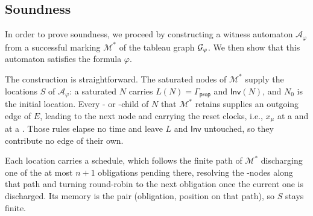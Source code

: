 \subsection{Soundness}\label{subsec:soundness}


In order to prove soundness, we proceed by constructing a witness automaton $\mathcal A_\varphi$ from a successful marking $\mathcal M^{*}$ of the tableau graph $\mathcal{G}_{\varphi}$. We then show that this automaton satisfies the formula $\varphi$.

The construction is straightforward. The saturated nodes of $\mathcal M^{*}$ supply the locations
$S$ of $\mathcal A_\varphi$: a saturated $N$ carries $L(N)=\Gamma_{\mathsf{prop}}$ and
$\mathsf{Inv}(N)$, and $N_0$ is the initial location. Every - or
-child of $N$ that $\mathcal M^{*}$ retains supplies an outgoing edge of $E$, leading
to the next node and carrying the reset clocks, i.e., $x_\mu$ at a  and at a . Those rules
elapse no time and leave $L$ and $\mathsf{Inv}$ untouched, so they contribute no edge of their own.

Each location carries a schedule, which follows the finite path of $\mathcal M^{*}$ discharging one of the at most $n+1$ obligations pending there, resolving the \ORn-nodes along that path and turning round-robin to the next obligation once the current one is discharged. Its memory is the pair (obligation, position on that path), so $S$ stays finite.

%
%
%
%

